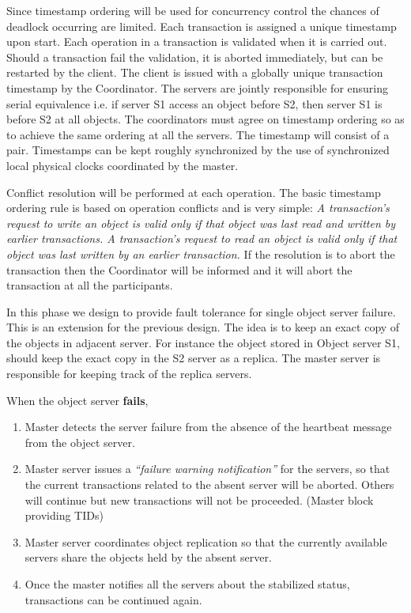 \documentclass[times, 10pt,twocolumn]{article}
\begin{document}
\label{subsec:dldetect}
Since timestamp ordering will be used for concurrency control the chances of deadlock occurring are limited.
Each transaction is assigned a unique timestamp upon start. Each operation in a transaction is validated when it is carried out.
Should a transaction fail the validation, it is aborted immediately, but can be restarted by the client. The client is issued with a globally unique transaction timestamp by the Coordinator. The servers are jointly responsible for ensuring serial equivalence i.e. if server S1 access an object before S2, then server S1 is before S2 at all objects. The coordinators must agree on timestamp ordering so as to achieve the same ordering at all the servers. The timestamp will consist of a {\it <local timestamp, server-id> } pair. Timestamps can be kept roughly synchronized by the use of synchronized local physical clocks coordinated by the master.

Conflict resolution will be performed at each operation.
The basic timestamp ordering rule is based on operation conflicts and is very simple:
{\it A transaction’s request to write an object is valid only if that object was last read and written by earlier transactions. A transaction’s request to read an object is valid only if that object was last written by an earlier transaction.} \cite[p.~215]{coulouris2005distributed}
If the resolution is to abort the transaction then the Coordinator will be informed and it will abort the transaction at all the participants.

\label{subsec:faultol}
In this phase we design to provide fault tolerance for single object server failure. This is an extension for the previous design. The idea is to keep an exact copy of the objects in adjacent server.
For instance the object stored in Object server S1, should keep the exact copy in the S2 server as a replica. The master server is responsible for keeping track of the replica servers.

When the object server {\bf fails},
\begin{enumerate}
\item Master detects the server failure from the absence of the heartbeat message from the object server.
\item Master server issues a {\it “failure warning notification”} for the servers, so that the current transactions related to the absent server will be aborted.
Others will continue but new transactions will not be proceeded. (Master block providing TIDs)
\item Master server coordinates object replication so that the currently available servers share the objects held by the absent server.
\item Once the master notifies all the servers about the stabilized status, transactions can be continued again.
\end{enumerate}
\end{document}
